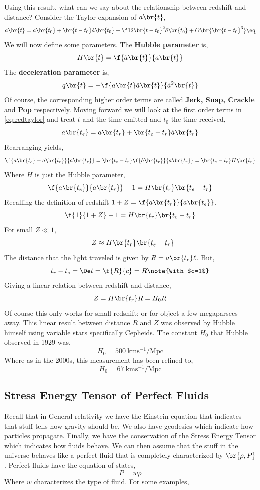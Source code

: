 \documentclass{article}
\begin{document}
Using this result, what can we say about the relationship between redshift and distance? Consider the Taylor expansion of $a\br{t}$,
\[ a\br{t} = a \br{t_0} + \br{t- t_0}\dot{a}\br{t_0} + \f12\br{t- t_0}^2\ddot{a}\br{t_0} + O\br{\br{t-t_0}^3} \eq\label{eq:redtaylor}\]
We will now define some parameters. The \textbf{Hubble parameter} is,
\[ H\br{t} = \f{\dot{a}\br{t}}{a\br{t}} \]
The \textbf{deceleration parameter} is,
\[ q\br{t} = - \f{a\br{t}\ddot{a}\br{t}}{\dot{a}^2\br{t}}\]
Of course, the corresponding higher order terms are called \textbf{Jerk, Snap, Crackle} and \textbf{Pop} respectively. Moving forward we will look at the first order terms in \eqref{eq:redtaylor} and treat $t$ and the time emitted and $t_0$ the time received,
\[ a\br{t_e} = a \br{t_r} + \br{t_e - t_r}\dot{a}\br{t_r} \]
Rearranging yields,
\[ \f{a\br{t_e} - a \br{t_r}}{a\br{t_r}} = \br{t_e - t_r}\f{\dot{a}\br{t_r}}{a\br{t_r}} = \br{t_e - t_r}H\br{t_r} \]
Where $H$ is just the Hubble parameter,
\[ \f{a\br{t_e}}{a\br{t_r}} - 1 = H\br{t_r}\br{t_e - t_r} \]
Recalling the definition of redshift $1 + Z = \f{a\br{t_r}}{a\br{t_e}}$,
\[ \f{1}{1+Z} - 1 = H\br{t_r}\br{t_e - t_r} \]
For small $Z \ll 1$,
\[ -Z \approx H\br{t_r}\br{t_e - t_r} \]
The distance that the light traveled is given by $R = a\br{t_r} \ell$. But,
\[ t_r - t_e = \De t = \f{R}{c} = R \note{With $c=1$}\]
Giving a linear relation between redshift and distance,
\[ Z = H\br{t_r}R = H_0 R\]
Of course this only works for small redshift; or for object a few megaparsecs away. This linear result between distance $R$ and $Z$ was observed by Hubble himself using variable stars specifically Cepheids. The constant $H_0$ that Hubble observed in 1929 was,
\[ H_0 = \SI{500}{\km \s^{-1} \per \text{Mpc}} \]
Where as in the 2000s, this measurement has been refined to,
\[ H_0 = \SI{67}{\km \s^{-1} \per \text{Mpc}} \]

\subsection{Stress Energy Tensor of Perfect Fluids}
Recall that in General relativity we have the Einstein equation that indicates that stuff tells how gravity should be. We also have geodesics which indicate how particles propagate. Finally, we have the conservation of the Stress Energy Tensor which indicates how fluids behave. We can then assume that the stuff in the universe behaves like a perfect fluid that is completely characterized by $\br{\rho, P}$. Perfect fluids have the equation of states,
\[ P = w \rho \]
Where $w$ characterizes the type of fluid. For some examples,\\
\end{document}
